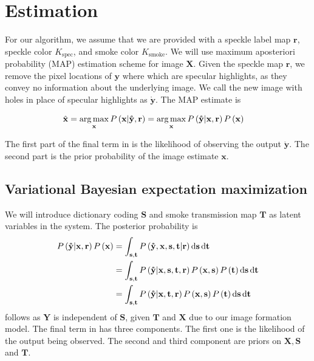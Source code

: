 \chapter{Estimation}

For our algorithm, we assume that we are provided with a speckle label map $\mathbf{r}$, speckle color $K_\text{spec}$, and smoke color $K_\text{smoke}$. We will use maximum aposteriori probability (MAP) estimation scheme for image $\mathbf{X}$. Given the speckle map $\mathbf{r}$, we remove the pixel locations of $\mathbf{y}$ where which are specular highlights, as they convey no information about the underlying image. We call the new image with holes in place of specular highlights as $\mathbf{\mathring y}$. The MAP estimate is

\begin{align}
\hat{\mathbf{x}} &= \operatorname*{arg\,max}_\mathbf{x} P \left( \mathbf{x} | \mathbf{\mathring y}, \mathbf{r} \right) = \operatorname*{arg\,max}_\mathbf{x} P \left( \mathbf{\mathring y} | \mathbf{x}, \mathbf{r} \right) P \left( \mathbf{x} \right) \label{eqn:simplemap}
\end{align}

The first part of the final term in  is the likelihood of observing the output $\mathbf{\mathring y}$. The second part is the prior probability of the image estimate $\mathbf{x}$.


\section{Variational Bayesian expectation maximization}
We will introduce dictionary coding $\mathbf{S}$ and smoke transmission map $\mathbf{T}$ as latent variables in the system. The posterior probability is 
\begin{align}
P \left( \mathbf{\mathring y} | \mathbf{x}, \mathbf{r} \right) P \left( \mathbf{x} \right) &= \int_{\mathbf{s}, \mathbf{t}} P \left( \mathbf{\mathring y}, \mathbf{x}, \mathbf{s}, \mathbf{t} | \mathbf{r} \right) \mathop{}\!\mathrm{d} \mathbf{s} \mathop{}\!\mathrm{d}\mathbf{t} \\
&= \int_{\mathbf{s}, \mathbf{t}} P \left( \mathbf{\mathring y} | \mathbf{x}, \mathbf{s},  \mathbf{t}, \mathbf{r} \right)  P \left(\mathbf{x}, \mathbf{s} \right) P \left( \mathbf{t} \right) \mathop{}\!\mathrm{d}\mathbf{s} \mathop{}\!\mathrm{d}\mathbf{t} \label{eqn:mapDerive1}\\
&= \int_{\mathbf{s}, \mathbf{t}} P \left( \mathbf{\mathring y} | \mathbf{x}, \mathbf{t}, \mathbf{r} \right)  P \left(\mathbf{x}, \mathbf{s} \right) P \left( \mathbf{t} \right) \mathop{}\!\mathrm{d}\mathbf{s} \mathop{}\!\mathrm{d}\mathbf{t}  \label{eqn:mapDerive2}
\end{align}
 follows as $\mathbf{Y}$ is independent of $\mathbf{S}$, given $\mathbf{T}$ and $\mathbf{X}$ due to our image formation model.
The final term in  has three components. The first one is the likelihood of the output being observed. The second and third component are priors on $\mathbf{X}, \mathbf{S}$ and $\mathbf{T}$.

